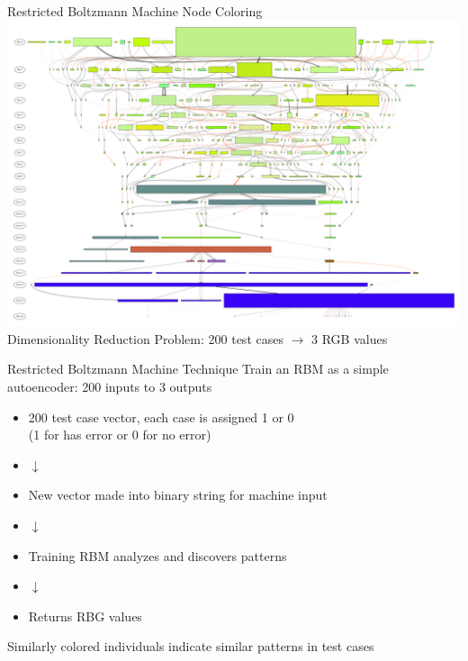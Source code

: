 \documentclass{beamer}
\begin{document}
\begin{frame}{Restricted Boltzmann Machine Node Coloring}
\centering
\includegraphics[width=.85\textwidth]{Illustrations/run0_RBM_color_full_30000.pdf} \\
Dimensionality Reduction Problem: 200 test cases $\rightarrow$ 3 RGB values
\end{frame}

\begin{frame}{Restricted Boltzmann Machine Technique}
\centering
Train an RBM as a simple autoencoder: 200 inputs to 3 outputs
\vspace{1em}

\begin{itemize}
\centering
\item 200 test case vector, each case is assigned 1 or 0 \\ (1 for has error or 0 for no error)
\item $\downarrow$
\item New vector made into binary string for machine input
\item $\downarrow$
\item Training RBM analyzes and discovers patterns
\item $\downarrow$
\item Returns RBG values
\end{itemize}
\vspace{1em}

Similarly colored individuals indicate similar patterns in test cases
\end{frame}
\end{document}
